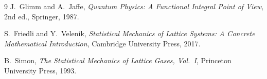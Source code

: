 \documentclass[a4paper,11pt]{article}
\begin{document}
\begin{thebibliography}{9}
J.~Glimm and A.~Jaffe,
\emph{Quantum Physics: A Functional Integral Point of View},
2nd ed., Springer, 1987.

S.~Friedli and Y.~Velenik,
\emph{Statistical Mechanics of Lattice Systems:
A Concrete Mathematical Introduction},
Cambridge University Press, 2017.

B.~Simon,
\emph{The Statistical Mechanics of Lattice Gases, Vol.~I},
Princeton University Press, 1993.
\end{thebibliography}
\end{document}
